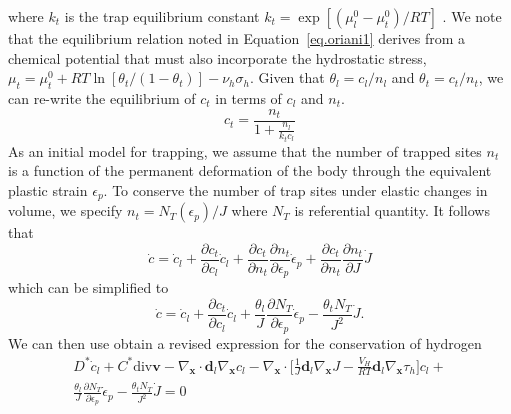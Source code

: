 \documentclass[10pt]{elsarticle}
\newcommand{\mbs}[1]{\boldsymbol{#1}}
\def\bs{{\mbs{s}}} \def\bt{{\mbs{t}}} \def\bu{{\mbs{u}}}
\def\bs{\boldsymbol}
\begin{document}
where $k_t$ is the trap equilibrium constant $k_{t} = \exp[(\mu^{0}_{l} - \mu^{0}_{t})/RT]$ .  We note that the equilibrium relation noted in Equation~\ref{eq.oriani1} derives from a chemical potential that must also incorporate the hydrostatic stress, $\mu_{t} =  \mu_{t}^{0} + RT\ln[\theta_{t}/(1-\theta_{t})] - \nu_{h}\sigma_{h} $. Given that $\theta_{l} = c_{l}/n_{l}$ and $\theta_{t} = c_{t}/n_{t}$, we can re-write the equilibrium of $c_{t}$ in terms of $c_{l}$ and $n_{t}$. 
%
\begin{equation}
\label{eq.oriani2} c_{t} = \frac{n_{t}}{1 + \frac{n_{l}}{k_{t} c_{l}}}
\end{equation}
As an initial model for trapping, we assume that the number of trapped sites $n_{t}$ is a function of the permanent deformation of the body through the equivalent plastic strain $\epsilon_{p}$. To conserve the number of trap sites under elastic changes in volume, we specify $n_{t} = N_{T}(\epsilon_{p})/J$ where $N_{T}$ is referential quantity.  It follows that
%
\begin{equation}
\label{eq.cdot2}{\dot{c} = \dot{c}_{l} + \frac{\partial c_{t}}{\partial c_{l}} \dot{c}_{l} + \frac{\partial c_{t}}{\partial n_{t}} \frac{\partial n_{t}}{\partial \epsilon_{p}} \dot{\epsilon}_{p}} +  \frac{\partial c_{t}}{\partial n_{t}} \frac{\partial n_{t}}{\partial J} \dot{J}
\end{equation}
%
which can be simplified to
%
\begin{equation}
\label{eq.cdot}{\dot{c} = \dot{c}_{l} + \frac{\partial c_{t}}{\partial c_{l}} \dot{c}_{l} + \frac{\theta_{l}}{J} \frac{\partial N_{T}}{\partial \epsilon_{p}} \dot{\epsilon}_{p} -  \frac{\theta_{t} N_{T}}{J^{2}}  \dot{J}}.
\end{equation}
%
We can then use obtain a revised expression for the conservation of hydrogen
\begin{align}
\label{eq.hconservation4}  
 D^{*}\dot{c}_{l} + C^{*}\text{div}\bs{v} - \nabla_{\bs{x}} \cdot \bs{d}_{l} \nabla_{\bs{x}}c_{l}   -  \nabla_{\bs{x}} \cdot \bigg[ \frac{1}{J} \bs{d}_{l} \nabla_{\bs{x}}J -  \frac{V_{H}}{R T} \bs{d}_{l} \nabla_{\bs{x}}\tau_{h}\bigg] c_{l}  +  \nonumber \\ \frac{\theta_{l}}{J} \frac{\partial N_{T}}{\partial \epsilon_{p}} \dot{\epsilon}_{p} -  \frac{\theta_{t} N_{T}}{J^{2}}  \dot{J} = 0
\end{align}
\end{document}
